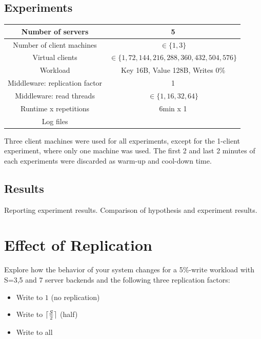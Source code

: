 \documentclass[11pt]{article}
\DeclarePairedDelimiter{\ceil}{\lceil}{\rceil}
\newcommand{\todo}[1]{\fcolorbox{black}{Apricot}{TODO: #1}}
\begin{document}
\subsection{Experiments}
\begin{center}
\small{
\smallskip
\begin{tabular}{|c|c|}
\hline Number of servers & 5 \\ 
\hline Number of client machines & $\in \{1, 3\}$ \\ 
\hline Virtual clients & $\in \{1, 72, 144, 216, 288, 360, 432, 504, 576\}$ \\ 
\hline Workload & Key 16B, Value 128B, Writes 0\% \\
\hline Middleware: replication factor & 1 \\ 
\hline Middleware: read threads & $\in\{1, 16, 32, 64\}$ \\ 
\hline Runtime x repetitions & 6min x 1 \\ 
\hline Log files & \todo{} \\
\hline 
\end{tabular} }
\end{center}

Three client machines were used for all experiments, except for the 1-client experiment, where only one machine was used. The first 2 and last 2 minutes of each experiments were discarded as warm-up and cool-down time.

\subsection{Results}
Reporting experiment results. Comparison of hypothesis and experiment results.

\section{Effect of Replication}

Explore how the behavior of your system changes for a 5\%-write workload with S=3,5 and 7 server backends and the following three replication factors:
\begin{itemize} 
\item Write to $1$ (no replication) 
\item Write to $\ceil{\frac{S}{2}}$ (half) 
\item Write to all 
\end{itemize}
\end{document}
